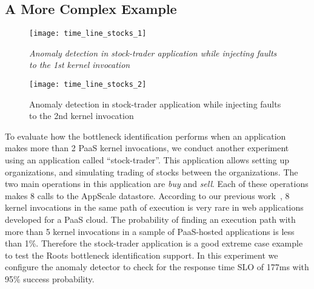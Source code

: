 
\subsection{A More Complex Example}

\begin{figure}
\centering
\texttt{[image: time\_line\_stocks\_1]}
\caption{\textit{Anomaly detection in stock-trader application while injecting faults to the 1st kernel invocation 
}}
\label{fig:time_line_stocks_1}
\end{figure}

\begin{figure}
\centering
\texttt{[image: time\_line\_stocks\_2]}
\caption{Anomaly detection in stock-trader application while injecting faults to the 2nd kernel invocation}
\label{fig:time_line_stocks_2}
\end{figure}

To evaluate how the bottleneck identification performs when an application makes more than 2
PaaS kernel invocations, we conduct another experiment using an application
called ``stock-trader''.
This application allows setting up organizations, and simulating trading of stocks between the
organizations. The two main operations in this application are \textit{buy} and \textit{sell}. Each of
these operations makes 8 calls to the AppScale datastore. 
According to our previous work~\cite{Jayathilaka:2015:RTS:2806777.2806842}, 8 kernel invocations in the
same path of execution is very rare in web applications developed for a PaaS cloud. The probability
of finding an execution path with more than 5 kernel invocations in a sample of PaaS-hosted
applications is less than 1\%. Therefore the stock-trader application is a good extreme case
example to test the Roots bottleneck identification support.
In this experiment we configure the anomaly
detector to check for the response time SLO of 177ms with 95\% success probability.

